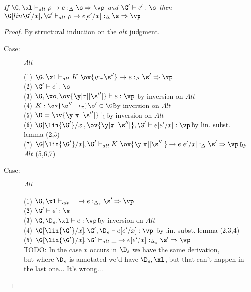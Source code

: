 \begin{sublemma}
\emph{If $\G, \xl \vdash_{alt} \rho \to e :_\Delta \s \Rightarrow \vp$ and $\G'
    \vdash e' : \s$ then $\G[lin{\G'}/x],\G' \vdash_{alt} \rho \to e[e'/x] :_\Delta \s
    \Rightarrow \vp$}
\end{sublemma}

\begin{proof}
By structural induction on the $alt$ judgment.

\begin{description}
\item[Case:] $Alt$
\begin{tabbing}
    (1) $\G, \xl \vdash_{alt} K~\ov{y{:}_\pi\s''} \to e :_\Delta \s' \Rightarrow \vp$\\
    (2) $\G' \vdash e' : \s$\\
    (3) $\G, \xo, \ov{\y[\pi][\s'']} \vdash e : \vp$ \` by inversion on $Alt$\\
    (4) $K : \ov{\s'' \to_\pi} \s' \in \G$\` by inversion on $Alt$\\
    (5) $\D = \ov{\y[\pi][\s'']}\!\upharpoonright_1$\` by inversion on $Alt$\\
    (6) $\G[\lin{\G'}/x],\ov{\y[\pi][\s'']},\G' \vdash e[e'/x] : \vp$\` by lin. subst. lemma (2,3)\\
    (7) $\G[\lin{\G'}/x], \G' \vdash_{alt} K~\ov{\y[\pi][\s'']} \to e[e'/x] :_\Delta \s' \Rightarrow \vp$\` by $Alt$ (5,6,7)\\
\end{tabbing}

\item[Case:] $Alt_\_$
\begin{tabbing}
    (1) $\G, \xl \vdash_{alt} \_ \to e :_{\Delta_s}\s' \Rightarrow \vp$\\
    (2) $\G' \vdash e' : \s$\\
    (3) $\G, \D_s, \xl \vdash e : \vp$\` by inversion on $Alt_\_$\\
    (4) $\G[\lin{\G'}/x],\G',\D_s \vdash e[e'/x] : \vp$ \` by lin. subst. lemma (2,3,4)\\
    (5) $\G[\lin{\G'}/x],\G' \vdash_{alt} \_ \to e[e'/x] :_{\Delta_s} \s' \Rightarrow \vp$\\
    TODO: In the case $x$ occurs in $\D_s$ we have the same derivation,\\
    but where $\D_s$ is annotated we'd have $\D_s,\xl$, but that can't happen in the last one... It's wrong...
\end{tabbing}

\end{description}

\end{proof}


